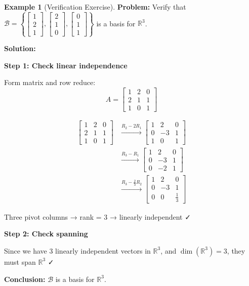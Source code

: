 \documentclass[12pt,a4paper]{article}
\theoremstyle{definition}
\newtheorem{example}{Example}[section]
\begin{document}
\begin{example}[Verification Exercise]
\textbf{Problem:} Verify that $\mathcal{B} = \left\{\begin{bmatrix} 1 \\ 2 \\ 1 \end{bmatrix}, \begin{bmatrix} 2 \\ 1 \\ 0 \end{bmatrix}, \begin{bmatrix} 0 \\ 1 \\ 1 \end{bmatrix}\right\}$ is a basis for $\mathbb{R}^3$.

\textbf{Solution:}

\textbf{Step 1: Check linear independence}

Form matrix and row reduce:
\begin{equation}
A = \begin{bmatrix} 1 & 2 & 0 \\ 2 & 1 & 1 \\ 1 & 0 & 1 \end{bmatrix}
\end{equation}

\begin{align}
\begin{bmatrix} 1 & 2 & 0 \\ 2 & 1 & 1 \\ 1 & 0 & 1 \end{bmatrix} &\xrightarrow{R_2 - 2R_1} \begin{bmatrix} 1 & 2 & 0 \\ 0 & -3 & 1 \\ 1 & 0 & 1 \end{bmatrix} \\
&\xrightarrow{R_3 - R_1} \begin{bmatrix} 1 & 2 & 0 \\ 0 & -3 & 1 \\ 0 & -2 & 1 \end{bmatrix} \\
&\xrightarrow{R_3 - \frac{2}{3}R_2} \begin{bmatrix} 1 & 2 & 0 \\ 0 & -3 & 1 \\ 0 & 0 & \frac{1}{3} \end{bmatrix}
\end{align}

Three pivot columns → rank = 3 → linearly independent ✓

\textbf{Step 2: Check spanning}

Since we have 3 linearly independent vectors in $\mathbb{R}^3$, and $\dim(\mathbb{R}^3) = 3$, they must span $\mathbb{R}^3$ ✓

\textbf{Conclusion:} $\mathcal{B}$ is a basis for $\mathbb{R}^3$.
\end{example}
\end{document}

